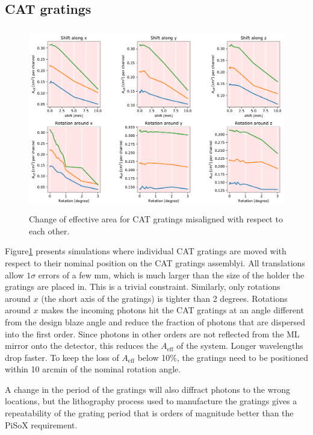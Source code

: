 \documentclass[]{spie}  %
\begin{document}
\subsection{CAT gratings}
\begin{figure} [ht]
  \begin{center}
    \includegraphics[height=8cm]{CAT_individual.pdf}
  \end{center}
  \caption
      { \label{fig:CAT_individual}Change of effective area for CAT gratings misaligned with respect to each other.
}
\end{figure}

Figure\ref{fig:CAT_individual} presents simulations where individual
CAT gratings are moved with respect to their nominal position on the
CAT gratings assemblyi. All translations allow $1\sigma$ errors of a few
mm, which is much larger than the size of the holder the gratings are
placed in. This is a trivial constraint. Similarly, only rotations
around $x$ (the short axis of the gratings) is tighter than 2
degrees. Rotations around $x$ makes the incoming photons hit the CAT
gratings at an angle different from the design blaze angle and reduce
the fraction of photons that are dispersed into the first order. Since
photons in other orders are not reflected from the ML mirror onto the
detector, this reduces the $A_{\mathrm{eff}}$ of the system. Longer
wavelengths drop faster. To keep the loss of $A_{\mathrm{eff}}$ below
10\%, the gratings need to be positioned within 10 arcmin of the
nominal rotation angle.

A change in the period of the gratings will also diffract photons to
the wrong locations, but the lithography process used to manufacture
the gratings gives a repeatability of the grating period that is
orders of magnitude better than the PiSoX requirement.
\end{document}
